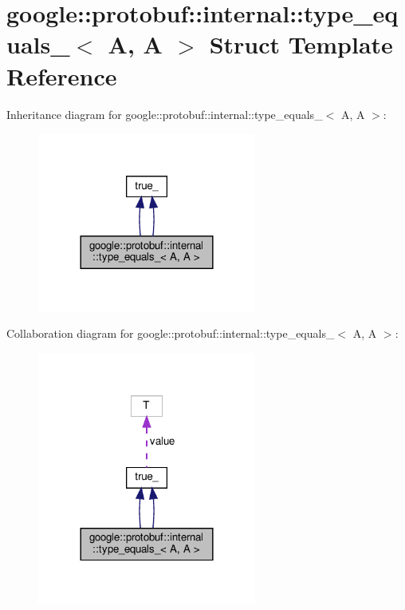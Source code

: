 \hypertarget{structgoogle_1_1protobuf_1_1internal_1_1type__equals___3_01A_00_01A_01_4}{}\section{google\+:\+:protobuf\+:\+:internal\+:\+:type\+\_\+equals\+\_\+$<$ A, A $>$ Struct Template Reference}
\label{structgoogle_1_1protobuf_1_1internal_1_1type__equals___3_01A_00_01A_01_4}


Inheritance diagram for google\+:\+:protobuf\+:\+:internal\+:\+:type\+\_\+equals\+\_\+$<$ A, A $>$\+:
\nopagebreak
\begin{figure}[H]
\begin{center}
\leavevmode
\includegraphics[width=204pt]{structgoogle_1_1protobuf_1_1internal_1_1type__equals___3_01A_00_01A_01_4__inherit__graph}
\end{center}
\end{figure}


Collaboration diagram for google\+:\+:protobuf\+:\+:internal\+:\+:type\+\_\+equals\+\_\+$<$ A, A $>$\+:
\nopagebreak
\begin{figure}[H]
\begin{center}
\leavevmode
\includegraphics[width=204pt]{structgoogle_1_1protobuf_1_1internal_1_1type__equals___3_01A_00_01A_01_4__coll__graph}
\end{center}
\end{figure}
